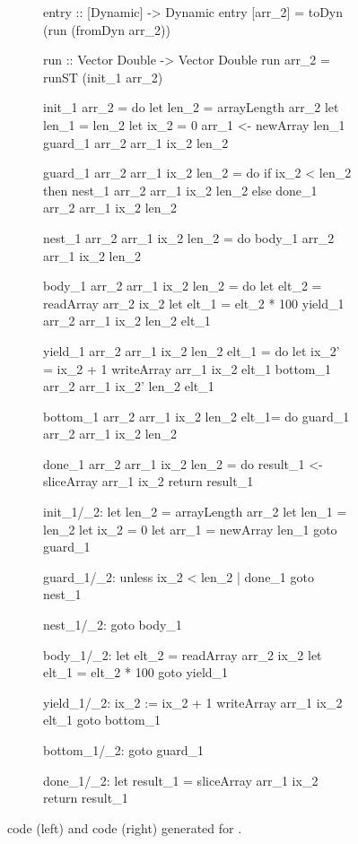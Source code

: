 \documentclass[preamble.tex]{subfiles}
\begin{document}

\begin{figure}
\hspace*{-1cm}
\begin{subfigure}{.6\textwidth}
\begin{hscode}[%
  columns=fullflexible, %
  keepspaces,           %
  literate=
    {_1}{{\sub{map}}}3
    {_2}{{\sub{xs}}}2,
]
entry :: [Dynamic] -> Dynamic
entry [arr_2] = toDyn (run (fromDyn arr_2))

run :: Vector Double -> Vector Double
run arr_2 = runST (init_1 arr_2)

init_1 arr_2 = do
  let len_2 = arrayLength arr_2
  let len_1 = len_2
  let ix_2 = 0
  arr_1 <- newArray len_1
  guard_1 arr_2 arr_1 ix_2 len_2

guard_1 arr_2 arr_1 ix_2 len_2 = do
  if ix_2 < len_2
    then nest_1 arr_2 arr_1 ix_2 len_2
    else done_1 arr_2 arr_1 ix_2 len_2

nest_1 arr_2 arr_1 ix_2 len_2 = do
  body_1 arr_2 arr_1 ix_2 len_2

body_1 arr_2 arr_1 ix_2 len_2 = do
  let elt_2 = readArray arr_2 ix_2
  let elt_1 = elt_2 * 100
  yield_1 arr_2 arr_1 ix_2 len_2 elt_1

yield_1 arr_2 arr_1 ix_2 len_2 elt_1 = do
  let ix_2' = ix_2 + 1
  writeArray arr_1 ix_2 elt_1
  bottom_1 arr_2 arr_1 ix_2' len_2 elt_1

bottom_1 arr_2 arr_1 ix_2 len_2 elt_1= do
  guard_1 arr_2 arr_1 ix_2 len_2

done_1 arr_2 arr_1 ix_2 len_2 = do
  result_1 <- sliceArray arr_1 ix_2
  return result_1
\end{hscode}
\end{subfigure}%
%
\begin{subfigure}{.55\textwidth}
\begin{loopcode}[%
  literate=
    {_1}{{\sub{map}}}3
    {_2}{{\sub{xs}}}2,
]






init_1/_2:
  let len_2 = arrayLength arr_2
  let len_1 = len_2
  let ix_2 = 0
  let arr_1 = newArray len_1
  goto guard_1

guard_1/_2:
  unless ix_2 < len_2 | done_1
  goto nest_1


nest_1/_2:
  goto body_1

body_1/_2:
  let elt_2 = readArray arr_2 ix_2
  let elt_1 = elt_2 * 100
  goto yield_1

yield_1/_2:
  ix_2 := ix_2 + 1
  writeArray arr_1 ix_2 elt_1
  goto bottom_1

bottom_1/_2:
  goto guard_1

done_1/_2:
  let result_1 = sliceArray arr_1 ix_2
  return result_1
\end{loopcode}
\end{subfigure}
\caption{\Haskell code (left) and \Loop code (right) generated for .}
\label{fig:times100-hs-loop}
\end{figure}
\end{document}
